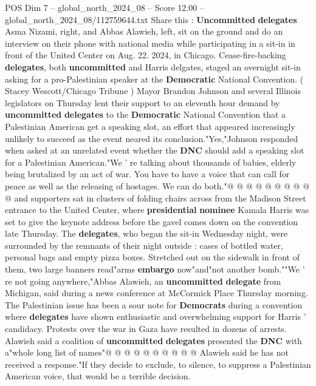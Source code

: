 \begin{textsample}{POS Dim 7 – global\_north\_2024\_08 – Score 12.00 – global\_north\_2024\_08/112759644.txt}  \label{ex:f7_pos_016}
Share this : \textbf{Uncommitted} \textbf{delegates} Asma Nizami, right, and Abbas Alawieh, left, sit on the ground and do an interview on their phone with national media while participating in a sit-in in front of the United Center on Aug. 22. 2024, in Chicago.
Cease-fire-backing \textbf{delegates}, both \textbf{uncommitted} and Harris delgates, staged an overnight sit-in asking for a pro-Palestinian speaker at the \textbf{Democratic} National Convention. ( Stacey Wescott/Chicago Tribune ) Mayor Brandon Johnson and several Illinois legislators on Thursday lent their support to an eleventh hour demand by \textbf{uncommitted} \textbf{delegates} to the \textbf{Democratic} National Convention that a Palestinian American get a speaking slot, an effort that appeared increasingly unlikely to succeed as the event neared its conclusion."Yes,"Johnson responded when asked at an unrelated event whether the \textbf{DNC} should add a speaking slot for a Palestinian American."We ' re talking about thousands of babies, elderly being brutalized by an act of war.
You have to have a voice that can call for peace as well as the releasing of hostages.
We can do both."@ @ @ @ @ @ @ @ @ @ and supporters sat in clusters of folding chairs across from the Madison Street entrance to the United Center, where \textbf{presidential} \textbf{nominee} Kamala Harris was set to give the keynote address before the gavel comes down on the convention late Thursday.
The \textbf{delegates}, who began the sit-in Wednesday night, were surrounded by the remnants of their night outside : cases of bottled water, personal bags and empty pizza boxes.
Stretched out on the sidewalk in front of them, two large banners read"arms \textbf{embargo} now"and"not another bomb.""We ' re not going anywhere,"Abbas Alawieh, an \textbf{uncommitted} \textbf{delegate} from Michigan, said during a news conference at McCormick Place Thursday morning.
The Palestinian issue has been a sour note for \textbf{Democrats} during a convention where \textbf{delegates} have shown enthusiastic and overwhelming support for Harris ' candidacy.
Protests over the war in Gaza have resulted in dozens of arrests.
Alawieh said a coalition of \textbf{uncommitted} \textbf{delegates} presented the \textbf{DNC} with a"whole long list of names"@ @ @ @ @ @ @ @ @ @ Alawieh said he has not received a response."If they decide to exclude, to silence, to suppress a Palestinian American voice, that would be a terrible decision.

\end{textsample}
